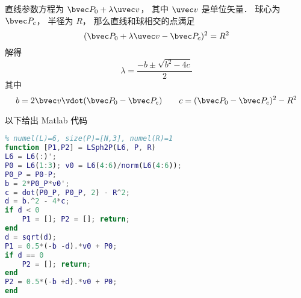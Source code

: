 
直线参数方程为 $\bvec P_0 + \lambda \uvec v$， 其中 $\uvec v$ 是单位矢量． 球心为 $\bvec P_c$， 半径为 $R$， 那么直线和球相交的点满足
\begin{equation}
(\bvec P_0 + \lambda \uvec v - \bvec P_c)^2 = R^2
\end{equation}
解得
\begin{equation}
\lambda = \frac{-b \pm \sqrt{b^2 - 4c}}{2}
\end{equation}
其中
\begin{equation}
b = 2\bvec v \vdot (\bvec P_0 - \bvec P_c)
\qquad
c = (\bvec P_0 - \bvec P_c)^2 - R^2
\end{equation}

以下给出 Matlab 代码
\begin{lstlisting}[language=matlab]
% 计算直线和球的焦点
% numel(L)=6, size(P)=[N,3], numel(R)=1
function [P1,P2] = LSph2P(L6, P, R)
L6 = L6(:)';
P0 = L6(1:3); v0 = L6(4:6)/norm(L6(4:6));
P0_P = P0-P;
b = 2*P0_P*v0';
c = dot(P0_P, P0_P, 2) - R^2;
d = b.^2 - 4*c;
if d < 0
    P1 = []; P2 = []; return;
end
d = sqrt(d);
P1 = 0.5*(-b -d).*v0 + P0;
if d == 0
    P2 = []; return;
end
P2 = 0.5*(-b +d).*v0 + P0;
end
\end{lstlisting}
